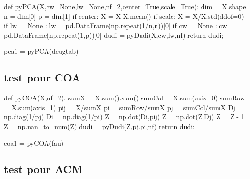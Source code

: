 \documentclass[
  10pt,
]{article}
\newenvironment{Shaded}{\begin{snugshade}}{\end{snugshade}}
\newcommand{\NormalTok}[1]{#1}
\begin{document}
\begin{Shaded}
\begin{Highlighting}[]
\NormalTok{def pyPCA(X,cw=None,lw=None,nf=2,center=True,scale=True):}
\NormalTok{  dim = X.shape}
\NormalTok{  n = dim[0]}
\NormalTok{  p = dim[1]  }
\NormalTok{  if center:}
\NormalTok{    X = X{-}X.mean()}
\NormalTok{  if scale:}
\NormalTok{    X = X/X.std(ddof=0)}
\NormalTok{  if lw==None :}
\NormalTok{    lw = pd.DataFrame(np.repeat(1/n,n))[0]}
\NormalTok{  if cw==None :}
\NormalTok{    cw = pd.DataFrame(np.repeat(1,p))[0]}
\NormalTok{  dudi = pyDudi(X,cw,lw,nf)  }
\NormalTok{  return dudi;}
\end{Highlighting}
\end{Shaded}

\begin{Shaded}
\begin{Highlighting}[]
\NormalTok{pca1 = pyPCA(deugtab)}
\end{Highlighting}
\end{Shaded}

\hypertarget{test-pour-coa}{%
\subsection{test pour COA}\label{test-pour-coa}}

\begin{Shaded}
\begin{Highlighting}[]
\NormalTok{def pyCOA(X,nf=2):}
\NormalTok{  sumX = X.sum().sum()}
\NormalTok{  sumCol =  X.sum(axis=0)}
\NormalTok{  sumRow = X.sum(axis=1)}
\NormalTok{  pij = X/sumX}
\NormalTok{  pi = sumRow/sumX}
\NormalTok{  pj = sumCol/sumX}
\NormalTok{  Dj = np.diag(1/pj)}
\NormalTok{  Di = np.diag(1/pi)}
\NormalTok{  Z = np.dot(Di,pij)}
\NormalTok{  Z = np.dot(Z,Dj)}
\NormalTok{  Z = Z {-} 1}
\NormalTok{  Z = np.nan\_to\_num(Z)}
\NormalTok{  dudi = pyDudi(Z,pj,pi,nf)  }
\NormalTok{  return dudi;}
\end{Highlighting}
\end{Shaded}

\begin{Shaded}
\begin{Highlighting}[]
\NormalTok{coa1 = pyCOA(fau)}
\end{Highlighting}
\end{Shaded}

\hypertarget{test-pour-acm}{%
\subsection{test pour ACM}\label{test-pour-acm}}
\end{document}
